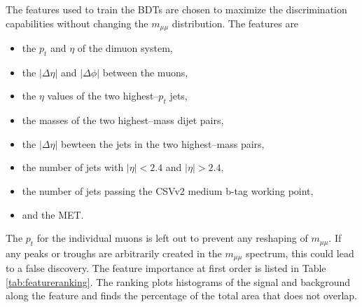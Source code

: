 The features used to train the BDTs are chosen to maximize the discrimination capabilities without changing the $m_{\mu\mu}$ distribution. The features are
\begin{itemize}
\item the $p_t$ and $\eta$ of the dimuon system, \vspace{-10pt}
\item the $|\Delta\eta|$ and $|\Delta\phi|$ between the muons, \vspace{-10pt}
\item the $\eta$ values of the two highest--$p_t$ jets, \vspace{-10pt}
\item the masses of the two highest--mass dijet pairs, \vspace{-10pt}
\item the $|\Delta\eta|$ bewteen the jets in the two highest--mass pairs, \vspace{-10pt}
\item the number of jets with $|\eta| < 2.4$ and $|\eta| > 2.4$, \vspace{-10pt}
\item the number of jets passing the CSVv2 medium b-tag working point, \vspace{-10pt}
\item and the MET.
\end{itemize}
The $p_t$ for the individual muons is left out to prevent any reshaping of $m_{\mu\mu}$. If any peaks or troughs are arbitrarily created in the $m_{\mu\mu}$ spectrum, this could lead to a false discovery. The feature importance at first order is listed in Table \ref{tab:featureranking}. The ranking plots histograms of the signal and background along the feature and finds the percentage of the total area that does not overlap.

